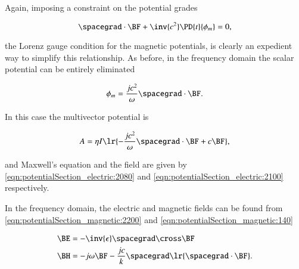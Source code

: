 Again, imposing a constraint on the potential grades

\begin{dmath}\label{eqn:potentialSection_magnetic:2180}
\spacegrad \cdot \BF
+ \inv{c^2}
\PD{t}{\phi_m}
= 0,
\end{dmath}

the Lorenz gauge condition for the magnetic potentials, is clearly an expedient way to simplify this relationship.
As before, in the frequency domain the scalar potential can be entirely eliminated

\begin{dmath}\label{eqn:potentialSection_magnetic:2200}
\phi_m = \frac{j c^2}{\omega} \spacegrad \cdot \BF.
\end{dmath}

In this case the
multivector potential is

\begin{dmath}\label{eqn:potentialSection_magnetic:2220}
A =
\eta I \lr{
-\frac{j c^2}{\omega} \spacegrad \cdot \BF + c \BF
},
\end{dmath}

and Maxwell's equation and the field are given by
\cref{eqn:potentialSection_electric:2080} and
\cref{eqn:potentialSection_electric:2100} respectively.

In the frequency domain, the electric and magnetic fields can be found from
\cref{eqn:potentialSection_magnetic:2200} and \cref{eqn:potentialSection_magnetic:140}

\begin{dmath}\label{eqn:potentialSection_magnetic:2540}
\begin{aligned}
\BE &= -\inv{\epsilon} \spacegrad \cross \BF \\
\BH &=
- j \omega \BF
-\frac{j c}{k} \spacegrad \lr{ \spacegrad \cdot \BF }
.
\end{aligned}
\end{dmath}

%
%

